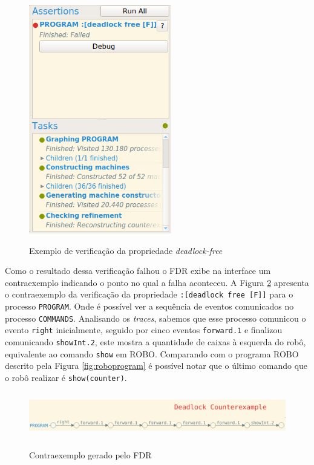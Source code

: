 \begin{figure}[h]
\centering
\caption{Exemplo de verificação da propriedade \textit{deadlock-free}}
\includegraphics[height=10cm]{figuras/assertion.png}
\label{fig:assertion}
\end{figure}
Como o resultado dessa verificação falhou o FDR exibe na interface um contraexemplo indicando o ponto no qual a falha aconteceu. A Figura \ref{fig:counterexem} apresenta o contraexemplo da verificação da propriedade \texttt{:[deadlock free [F]]} para o processo \texttt{PROGRAM}. Onde é possível ver a sequência de eventos comunicados no processo \texttt{COMMANDS}. Analisando os \textit{traces}, sabemos que esse processo comunicou o evento \texttt{right} inicialmente, seguido por cinco eventos \texttt{forward.1} e finalizou comunicando \texttt{showInt.2}, este mostra a quantidade de caixas à esquerda do robô, equivalente ao comando \texttt{show} em ROBO. Comparando com o programa ROBO descrito pela Figura \ref{fig:roboprogram} é possível notar que o último comando que o robô realizar é \texttt{show(counter)}.

\begin{figure}[h]
\centering
\caption{Contraexemplo gerado pelo FDR}
\includegraphics[height=2cm]{figuras/contraexe.png}
\label{fig:counterexem}
\end{figure}

